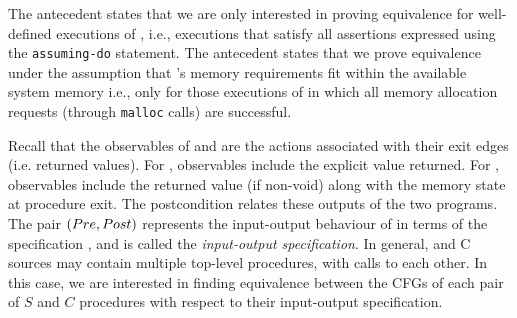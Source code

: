 The \sdef{} antecedent states that we are only interested in proving equivalence for
well-defined executions of \sprog{}, i.e., executions that satisfy all assertions expressed
using the {\tt assuming-do} statement.
The \cfits{} antecedent states that we prove equivalence under the assumption that \cprog{}'s memory
requirements fit within the available system memory i.e., only for those executions of \cprog{}
in which all memory allocation requests (through {\tt malloc} calls) are successful.

Recall that the observables of \sprog{} and \cprog{} are the actions associated with their exit edges (i.e. returned values).
For \sprog{}, observables include the explicit value returned.
For \cprog{}, observables include the returned value (if non-void) along with the memory state at procedure exit.
The postcondition \post{} relates these outputs of the two programs.
The pair $({Pre}{},{Post}{})$ represents the input-output behaviour of \cprog{} in terms of the specification \sprog{},
and is called the {\em input-output specification}.
In general, \SpecL{} and C sources may contain multiple top-level procedures, with calls to each other.
In this case, we are interested in finding equivalence between the CFGs of each pair
of $S$ and $C$ procedures with respect to their input-output specification.

